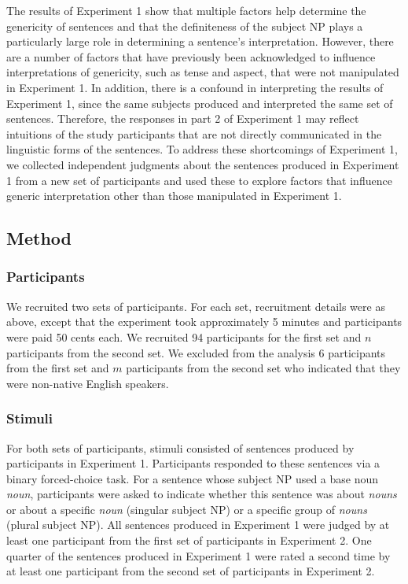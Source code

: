 \documentclass[10pt,letterpaper]{article}
\begin{document}
The results of Experiment 1 show that multiple factors help determine the genericity of sentences and that the definiteness of the subject NP plays a particularly large role in determining a sentence's interpretation. However, there are a number of factors that have previously been acknowledged to influence interpretations of genericity, such as tense and aspect, that were not manipulated in Experiment 1. In addition, there is a confound in interpreting the results of Experiment 1, since the same subjects produced and interpreted the same set of sentences. Therefore, the responses in part 2 of Experiment 1 may reflect intuitions of the study participants that are not directly communicated in the linguistic forms of the sentences. To address these shortcomings of Experiment 1, we collected independent judgments about the sentences produced in Experiment 1 from a new set of participants and used these to explore factors that influence generic interpretation other than those manipulated in Experiment 1.

\subsection{Method}

\subsubsection{Participants} 

We recruited two sets of participants. For each set, recruitment details were as above, except that the experiment took approximately 5 minutes and participants were paid 50 cents each. We recruited 94 participants for the first set and \(n\) participants from the second set. We excluded from the analysis 6 participants from the first set and \(m\) participants from the second set who indicated that they were non-native English speakers.

\subsubsection{Stimuli}  

For both sets of participants, stimuli consisted of sentences produced by participants in Experiment 1. Participants responded to these sentences via a binary forced-choice task. For a sentence whose subject NP used a base noun \textit{noun}, participants were asked to indicate whether this sentence was about \textit{nouns} or about a specific \textit{noun} (singular subject NP) or a specific group of \textit{nouns} (plural subject NP). All sentences produced in Experiment 1 were judged by at least one participant from the first set of participants in Experiment 2. One quarter of the sentences produced in Experiment 1 were rated a second time by at least one participant from the second set of participants in Experiment 2.
\end{document}
